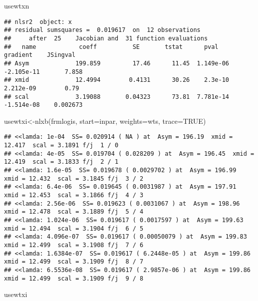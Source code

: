 \documentclass[
]{article}
\newenvironment{Shaded}{\begin{snugshade}}{\end{snugshade}}
\newcommand{\AttributeTok}[1]{\textcolor[rgb]{0.77,0.63,0.00}{#1}}
\newcommand{\ConstantTok}[1]{\textcolor[rgb]{0.00,0.00,0.00}{#1}}
\newcommand{\FunctionTok}[1]{\textcolor[rgb]{0.00,0.00,0.00}{#1}}
\newcommand{\NormalTok}[1]{#1}
\newcommand{\OtherTok}[1]{\textcolor[rgb]{0.56,0.35,0.01}{#1}}
\begin{document}
\begin{Shaded}
\begin{Highlighting}[]
\NormalTok{usewtxn}
\end{Highlighting}
\end{Shaded}

\begin{verbatim}
## nlsr2  object: x 
## residual sumsquares =  0.019617  on  12 observations
##     after  25    Jacobian and  31 function evaluations
##   name            coeff          SE       tstat      pval      gradient    JSingval   
## Asym             199.859         17.46      11.45  1.149e-06  -2.105e-11       7.858  
## xmid             12.4994        0.4131      30.26    2.3e-10   2.212e-09        0.79  
## scal             3.19088       0.04323      73.81  7.781e-14  -1.514e-08    0.002673
\end{verbatim}

\begin{Shaded}
\begin{Highlighting}[]
\NormalTok{usewtxi}\OtherTok{\textless{}{-}}\FunctionTok{nlxb}\NormalTok{(frmlogis, }\AttributeTok{start=}\NormalTok{inpar, }\AttributeTok{weights=}\NormalTok{wts, }\AttributeTok{trace=}\ConstantTok{TRUE}\NormalTok{)}
\end{Highlighting}
\end{Shaded}

\begin{verbatim}
## <<lamda: 1e-04  SS= 0.020914 ( NA ) at  Asym = 196.19  xmid = 12.417  scal = 3.1891 f/j  1 / 0
## <<lamda: 4e-05  SS= 0.019704 ( 0.028209 ) at  Asym = 196.45  xmid = 12.419  scal = 3.1833 f/j  2 / 1
## <<lamda: 1.6e-05  SS= 0.019678 ( 0.0029702 ) at  Asym = 196.99  xmid = 12.432  scal = 3.1845 f/j  3 / 2
## <<lamda: 6.4e-06  SS= 0.019645 ( 0.0031987 ) at  Asym = 197.91  xmid = 12.453  scal = 3.1866 f/j  4 / 3
## <<lamda: 2.56e-06  SS= 0.019623 ( 0.0031067 ) at  Asym = 198.96  xmid = 12.478  scal = 3.1889 f/j  5 / 4
## <<lamda: 1.024e-06  SS= 0.019617 ( 0.0017597 ) at  Asym = 199.63  xmid = 12.494  scal = 3.1904 f/j  6 / 5
## <<lamda: 4.096e-07  SS= 0.019617 ( 0.00050079 ) at  Asym = 199.83  xmid = 12.499  scal = 3.1908 f/j  7 / 6
## <<lamda: 1.6384e-07  SS= 0.019617 ( 6.2448e-05 ) at  Asym = 199.86  xmid = 12.499  scal = 3.1909 f/j  8 / 7
## <<lamda: 6.5536e-08  SS= 0.019617 ( 2.9857e-06 ) at  Asym = 199.86  xmid = 12.499  scal = 3.1909 f/j  9 / 8
\end{verbatim}

\begin{Shaded}
\begin{Highlighting}[]
\NormalTok{usewtxi}
\end{Highlighting}
\end{Shaded}
\end{document}
